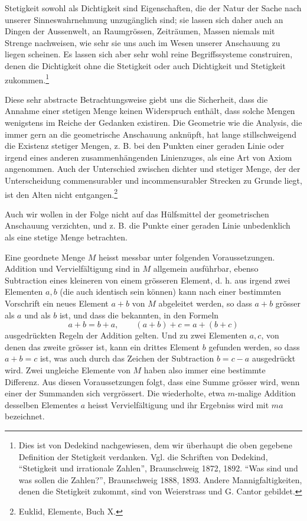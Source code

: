 \documentclass[11pt]{article}
\begin{document}
Stetigkeit sowohl als Dichtigkeit sind Eigenschaften, die der Natur der Sache nach unserer Sinneswahrnehmung unzugänglich sind; sie lassen sich daher auch an Dingen der Aussenwelt, an Raumgrössen, Zeiträumen, Massen niemals mit Strenge nachweisen, wie sehr sie uns auch im Wesen unserer Anschauung zu liegen scheinen. Es lassen sich aber sehr wohl reine Begriffssysteme construiren, denen die Dichtigkeit ohne die Stetigkeit oder auch Dichtigkeit und Stetigkeit zukommen.\footnote{Dies ist von Dedekind nachgewiesen, dem wir überhaupt die oben gegebene Definition der Stetigkeit verdanken. Vgl. die Schriften von Dedekind, ``Stetigkeit und irrationale Zahlen'', Braunschweig 1872, 1892. ``Was sind und was sollen die Zahlen?'', Braunschweig 1888, 1893. Andere Mannigfaltigkeiten, denen die Stetigkeit zukommt, sind von Weierstrass und G. Cantor gebildet.}


Diese sehr abstracte Betrachtungsweise giebt uns die Sicherheit, dass die Annahme einer stetigen Menge keinen Widerspruch enthält, dass solche Mengen wenigstens im Reiche der Gedanken existiren. Die Geometrie wie die Analysis, die immer gern an die geometrische Anschauung anknüpft, hat lange stillschweigend die Existenz stetiger Mengen, z. B. bei den Punkten einer geraden Linie oder irgend eines anderen zusammenhängenden Linienzuges, als eine Art von Axiom angenommen. Auch der Unterschied zwischen dichter und stetiger Menge, der der Unterscheidung commensurabler und incommensurabler Strecken zu Grunde liegt, ist den Alten nicht entgangen.\footnote{Euklid, Elemente, Buch X.}

Auch wir wollen in der Folge nicht auf das Hülfsmittel der geometrischen Anschauung verzichten, und z. B. die Punkte einer geraden Linie unbedenklich als eine stetige Menge betrachten.

Eine geordnete Menge $M$ heisst messbar unter folgenden Voraussetzungen. Addition und Vervielfältigung sind in $M$ allgemein ausführbar, ebenso Subtraction eines kleineren von einem grösseren Element, d. h. aus irgend zwei Elementen $a,b$ (die auch identisch sein können) kann nach einer bestimmten Vorschrift ein neues Element $a+b$ von $M$ abgeleitet werden, so dass $a+b$ grösser als $a$ und als $b$ ist, und dass die bekannten, in den Formeln
\[
 a+b=b+a,
 \qquad (a+b)+c=a+(b+c)
\]
ausgedrückten Regeln der Addition gelten. Und zu zwei Elementen $a,c$, von denen das zweite grösser ist, kann ein drittes Element $b$ gefunden werden, so dass $a+b=c$ ist, was auch durch das Zeichen der Subtraction $b=c-a$ ausgedrückt wird. Zwei ungleiche Elemente von $M$ haben also immer eine bestimmte Differenz. Aus diesen Voraussetzungen folgt, dass eine Summe grösser wird, wenn einer der Summanden sich vergrössert. Die wiederholte, etwa $m$-malige Addition desselben Elementes $a$ heisst Vervielfältigung und ihr Ergebniss wird mit $ma$ bezeichnet.
\end{document}
